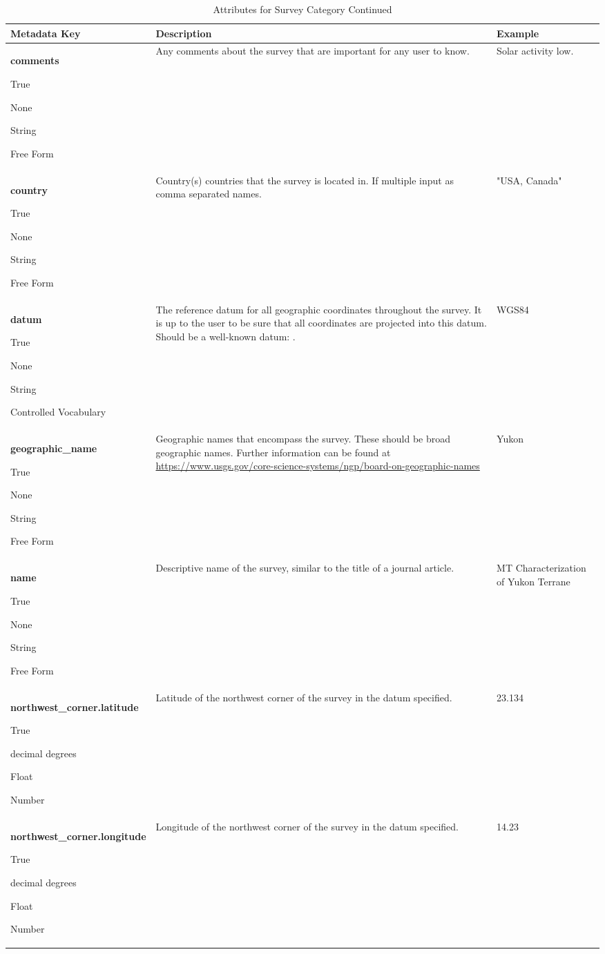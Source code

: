 \documentclass[12pt]{article}
\newcommand{\entry}[7]{
	\textbf{#1} 
	\begin{itemize}[topsep=5pt,itemsep=-.1pt,parsep=-2pt,partopsep=0pt,labelwidth=2em,align=left,itemindent=1em]
		\begin{small}
			\item[Required:] #2
			\item[Units:] #3
			\item[Type:] #4
			\item[Style:] #5
		\end{small}
	\end{itemize} & #6 & #7 \\ \midrule}
\begin{document}
\begin{table}[h!]
	\caption*{Attributes for Survey Category Continued}
	\begin{tabular}{p{}>{\raggedright}p{}p{}}
		\textbf{Metadata Key} & \textbf{Description} & \textbf{Example} \\ \toprule
		\entry{comments}{True}{None}{String}{Free Form}{Any comments about the survey that are important for any user to know.}{Solar activity low.}	
		\entry{country}{True}{None}{String}{Free Form}{Country(s) countries that the survey is located in. If multiple input as comma separated names.}{"USA, Canada"}
		\entry{datum}{True}{None}{String}{Controlled Vocabulary}{The reference datum for all geographic coordinates throughout the survey. It is up to the user to be sure that all coordinates are projected into this datum.  Should be a well-known datum: \qquad [ WGS84 $|$ NAD83 $|$ OSGB36 $|$ GDA94 $|$ ETRS89 $|$ PZ-90.11 $|$ other ].}{WGS84}
		\entry{geographic\_name}{True}{None}{String}{Free Form}{Geographic names that encompass the survey.  These should be broad geographic names.  Further information can be found at \url{https://www.usgs.gov/core-science-systems/ngp/board-on-geographic-names}}{Yukon}
		\entry{name}{True}{None}{String}{Free Form}{Descriptive name of the survey, similar to the title of a journal article.}{MT Characterization of Yukon Terrane}
		\entry{northwest\_corner.latitude}{True}{decimal degrees}{Float}{Number}{Latitude of the northwest corner of the survey in the datum specified.}{23.134}
		\entry{northwest\_corner.longitude}{True}{decimal degrees}{Float}{Number}{Longitude of the northwest corner of the survey in the datum specified.}{14.23}
	
	\end{tabular}
	\label{tab:survey2}
\end{table} 

\clearpage
\newpage
\end{document}
